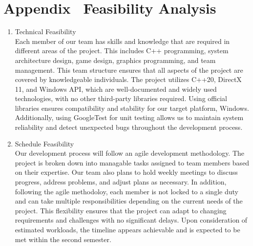 \section*{Appendix \thesection \, \textbar \vspace{0.5em} Feasibility Analysis}
\label{sec:appendix-feasibility}
%

\begin{enumerate}
    \item Technical Feasibility\\
    Each member of our team has skills and knowledge that are required in different areas of the project.
    This includes C++ programming, system architecture design, game design, graphics programming, and team management.
    This team structure ensures that all aspects of the project are covered by knowledgeable individuals.
    The project utilizes C++20, DirectX 11, and Windows API, which are well-documented and widely used technologies, with no other third-party libraries required.
    Using official libraries ensures compatibility and stability for our target platform, Windows.
    Additionally, using GoogleTest for unit testing allows us to maintain system reliability and detect unexpected bugs throughout the development process.

    \item Schedule Feasibility\\
    Our development process will follow an agile development methodology.
    The project is broken down into managable tasks assigned to team members based on their expertise.
    Our team also plans to hold weekly meetings to discuss progress, address problems, and adjust plans as necessary.
    In addition, following the agile methodoloy, each member is not locked to a single duty and can take multiple responsibilities depending on the current needs of the project.
    This flexibility ensures that the project can adapt to changing requirements and challenges with no significant delays.
    Upon consideration of estimated workloads, the timeline appears achievable and is expected to be met within the second semester.


\end{enumerate}
